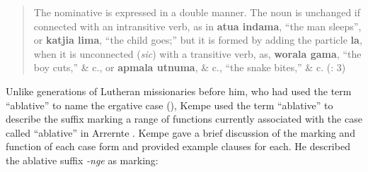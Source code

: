 \begin{quote}
The nominative is expressed in a double manner. The noun is unchanged if connected with an intransitive verb, as in \textbf{atua indama}, “the man sleeps”, or \textbf{katjia lima}, “the child goes;” but it is formed by adding the particle \textbf{la}, when it is unconnected (\textit{sic}) with a transitive verb, as, \textbf{worala gama}, “the boy cuts,” \& c., or \textbf{apmala utnuma}, \& c., “the snake bites,” \& c. (\citealt{kempe_grammar_1891}: 3)
\end{quote}


Unlike generations of Lutheran missionaries before him, who had used the term “ablative” to name the ergative case (), Kempe used the term “ablative” to describe the suffix marking a range of functions currently associated with the case called “ablative” in Arrernte \citep[185--187]{wilkins_mparntwe_1989}. Kempe gave a brief discussion of the marking and function of each case form and provided example clauses for each. He described the ablative suffix \textit{-nge} as marking:

